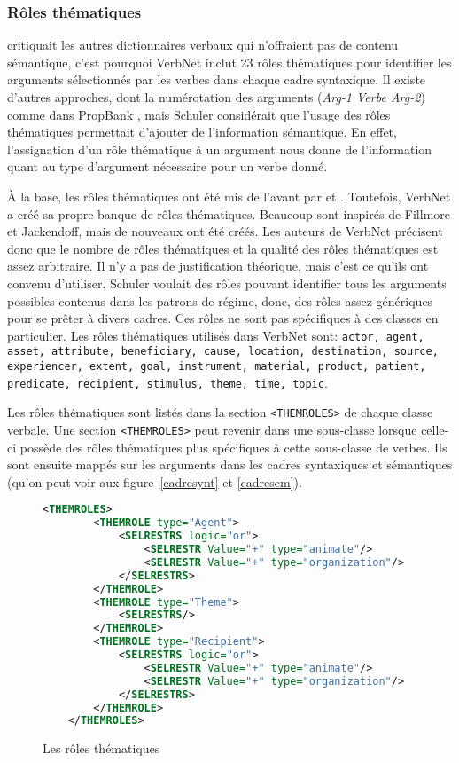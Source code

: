 \subsubsection{Rôles thématiques}
\cite{SchulerVerbnetBroadcoverageComprehensive2005} critiquait les autres dictionnaires verbaux qui n'offraient pas de contenu sémantique, c'est pourquoi VerbNet inclut 23 rôles thématiques pour identifier les arguments sélectionnés par les verbes dans chaque cadre syntaxique. Il existe d'autres approches, dont la numérotation des arguments (\emph{Arg-1 Verbe Arg-2}) comme dans PropBank \citep{PalmerPropositionBankAnnotated2005}, mais Schuler considérait que l'usage des rôles thématiques permettait d'ajouter de l'information sémantique. En effet, l'assignation d'un rôle thématique à un argument nous donne de l'information quant au type d'argument nécessaire pour un verbe donné.

À la base, les rôles thématiques ont été mis de l'avant par \cite{FillmoreCaseCase1968} et \cite{Jackendoff1972-JACSII-2}. Toutefois, VerbNet a créé sa propre banque de rôles thématiques. Beaucoup sont inspirés de Fillmore et Jackendoff, mais de nouveaux ont été créés. Les auteurs de VerbNet précisent donc que le nombre de rôles thématiques et la qualité des rôles thématiques est assez arbitraire. Il n'y a pas de justification théorique, mais c'est ce qu'ils ont convenu d'utiliser. Schuler voulait des rôles pouvant identifier tous les arguments possibles contenus dans les patrons de régime, donc, des rôles assez génériques pour se prêter à divers cadres. Ces rôles ne sont pas spécifiques à des classes en particulier.
Les rôles thématiques utilisés dans VerbNet sont: \texttt{actor, agent, asset, attribute, beneficiary, cause, location, destination, source, experiencer, extent, goal, instrument, material, product, patient, predicate, recipient, stimulus, theme, time, topic}.

Les rôles thématiques sont listés dans la section \lstinline|<THEMROLES>| de chaque classe verbale. Une section \lstinline|<THEMROLES>| peut revenir dans une sous-classe lorsque celle-ci possède des rôles thématiques plus spécifiques à cette sous-classe de verbes. Ils sont ensuite mappés sur les arguments dans les cadres syntaxiques et sémantiques (qu'on peut voir aux figure~\ref{cadresynt} et \ref{cadresem}).

\begin{figure}[htb]
 \label{}
 \caption{Les rôles thématiques}
\begin{lstlisting}[language=XML] % Majuscule aux captions
    <THEMROLES>
        <THEMROLE type="Agent">
            <SELRESTRS logic="or">
                <SELRESTR Value="+" type="animate"/>
                <SELRESTR Value="+" type="organization"/>
            </SELRESTRS>
        </THEMROLE>
        <THEMROLE type="Theme">
            <SELRESTRS/>
        </THEMROLE>
        <THEMROLE type="Recipient">
            <SELRESTRS logic="or">
                <SELRESTR Value="+" type="animate"/>
                <SELRESTR Value="+" type="organization"/>
            </SELRESTRS>
        </THEMROLE>
    </THEMROLES>
\end{lstlisting}
\end{figure}

